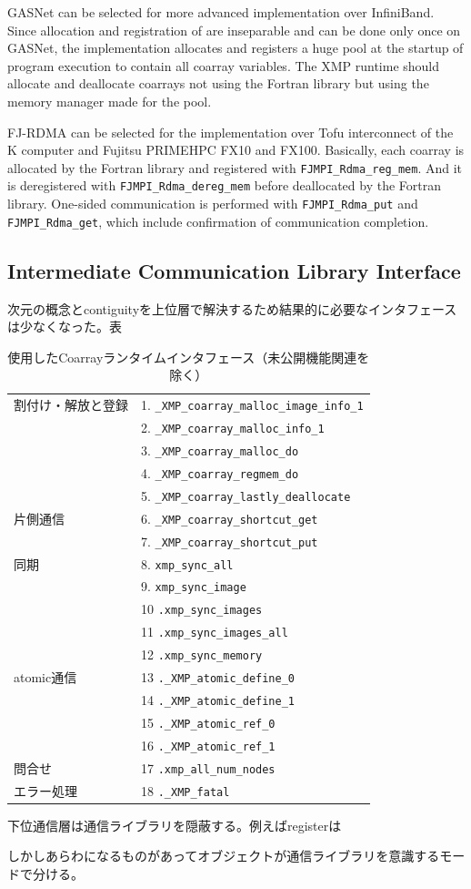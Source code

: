 GASNet can be selected for more advanced implementation over InfiniBand. 
Since allocation and registration of are inseparable and can be done only once 
on GASNet, the implementation allocates and registers a huge pool at the startup 
of program execution to contain all coarray variables. 
The XMP runtime should allocate and deallocate coarrays not using the Fortran 
library but using the memory manager made for the pool.

FJ-RDMA can be selected for the implementation over Tofu interconnect of the K computer 
and Fujitsu PRIMEHPC FX10 and FX100. Basically, each coarray is allocated by the Fortran 
library and registered with {\tt FJMPI_Rdma_reg_mem}. And it is deregistered with 
{\tt FJMPI_Rdma_dereg_mem} before deallocated by the Fortran library. 
One-sided communication is performed with {\tt FJMPI_Rdma_put} and {\tt FJMPI_Rdma_get}, 
which include confirmation of communication completion.


\subsection{Intermediate Communication Library Interface}


次元の概念とcontiguityを上位層で解決するため結果的に必要なインタフェースは少なくなった。表

\begin{table}
 \begin{center}
  \caption{使用したCoarrayランタイムインタフェース（未公開機能関連を除く）}
  \begin{tabular}{|l|l|}
\hline
割付け・解放と登録
& 1. \verb|_XMP_coarray_malloc_image_info_1|\\
& 2. \verb|_XMP_coarray_malloc_info_1|\\
& 3. \verb|_XMP_coarray_malloc_do|\\
& 4. \verb|_XMP_coarray_regmem_do|\\
& 5. \verb|_XMP_coarray_lastly_deallocate|\\
\hline
片側通信
& 6. \verb|_XMP_coarray_shortcut_get|\\
& 7. \verb|_XMP_coarray_shortcut_put|\\
\hline
同期
& 8. \verb|xmp_sync_all|\\
& 9. \verb|xmp_sync_image|\\
& 10 \verb|.xmp_sync_images|\\
& 11 \verb|.xmp_sync_images_all|\\
& 12 \verb|.xmp_sync_memory|\\
\hline
atomic通信
& 13 \verb|._XMP_atomic_define_0|\\
& 14 \verb|._XMP_atomic_define_1|\\
& 15 \verb|._XMP_atomic_ref_0|\\
& 16 \verb|._XMP_atomic_ref_1|\\
\hline
問合せ
& 17 \verb|.xmp_all_num_nodes|\\
\hline
エラー処理
& 18 \verb|._XMP_fatal|\\
\hline
  \end{tabular}
 \end{center}
\end{table}


下位通信層は通信ライブラリを隠蔽する。例えばregisterは

しかしあらわになるものがあってオブジェクトが通信ライブラリを意識するモードで分ける。

